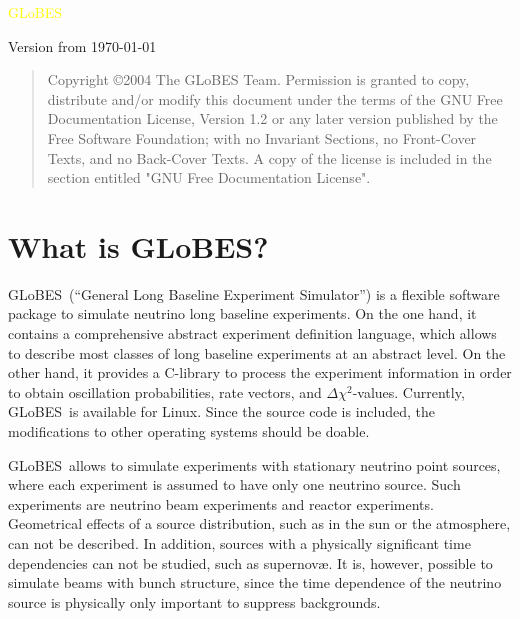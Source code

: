 \documentclass[a4paper,12pt,twoside]{book}
\newcommand{\GLOBES}{{\sf GLoBES}}
\begin{document}
{\begin{center}
\vspace*{-1cm}

{\Huge \textcolor{yellow}{GLoBES}}
\end{center}

\vspace{1cm}

\begin{center}
Version from \today
\end{center}



}

\clearpage
\thispagestyle{empty}
\bigskip
\begin{quote}
    Copyright \copyright  2004  The GLoBES Team.
    Permission is granted to copy, distribute and/or modify this document
    under the terms of the GNU Free Documentation License, Version 1.2
    or any later version published by the Free Software Foundation;
    with no Invariant Sections, no Front-Cover Texts, and no Back-Cover Texts.
    A copy of the license is included in the section entitled "GNU
    Free Documentation License".
\end{quote}
\bigskip
    


\cleardoublepage
\setcounter{page}{1}

\chapter*{What is \GLOBES ?}

\GLOBES\ (``General Long Baseline Experiment Simulator'') is a flexible
software package to simulate neutrino long baseline experiments. On the
one hand, it contains a comprehensive abstract experiment definition
language, which allows to describe most classes of long baseline experiments
at an abstract level. On the other hand, it provides a C-library to 
process the experiment information in order to obtain oscillation
probabilities, rate vectors, and $\Delta \chi^2$-values. Currently, 
\GLOBES\ is available for Linux. Since the source code is included,
the modifications to other operating systems should be doable.

\GLOBES\ allows to simulate experiments with stationary neutrino point sources, where each experiment is assumed to have only one neutrino source.
Such experiments are neutrino beam experiments and reactor experiments. 
Geometrical effects of a source distribution, such as in the sun or the 
atmosphere, can not be described. In addition, sources with a physically 
significant time dependencies  can not be studied, such as  supernov\ae. It 
is, however, possible to simulate beams with bunch structure, since the 
time dependence of the neutrino source is physically only important to suppress backgrounds. 
\end{document}

